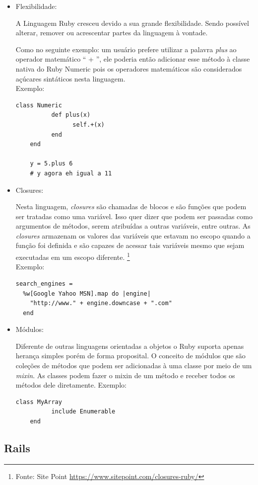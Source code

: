 \begin{itemize}
\item{Flexibilidade:}
    \par A Linguagem Ruby cresceu devido a sua grande flexibilidade. Sendo possível alterar, remover ou acrescentar partes da linguagem à vontade.
    \par Como no seguinte exemplo: um usuário prefere utilizar a palavra \emph{plus} ao operador matemático `` + '', ele poderia então adicionar esse método à classe nativa do Ruby Numeric pois os operadores matemáticos são considerados açúcares sintáticos nesta linguagem.
\\Exemplo:
\begin{lstlisting}[frame=single]
class Numeric
          def plus(x)
                self.+(x)
          end
    end

    y = 5.plus 6
    # y agora eh igual a 11
\end{lstlisting}
\item{Closures:}
    \par Nesta linguagem, \emph{closures} são chamadas de blocos e são funções que podem ser tratadas como uma variável. Isso quer dizer que podem ser passadas como argumentos de métodos, serem atribuídas a outras variáveis, entre outras. As \emph{closures} armazenam os valores das variáveis que estavam no escopo quando a função foi definida e são capazes de acessar tais variáveis mesmo que sejam executadas em um escopo diferente. \footnote{Fonte: Site Point \url{https://www.sitepoint.com/closures-ruby/}}
\\
Exemplo:
\begin{lstlisting}[frame=single]
search_engines =
  %w[Google Yahoo MSN].map do |engine|
    "http://www." + engine.downcase + ".com"
  end
\end{lstlisting}
\item{Módulos:}
    \par Diferente de outras linguagens orientadas a objetos o Ruby suporta apenas herança simples porém de forma proposital. O conceito de módulos que são coleções de métodos que podem ser adicionadas à uma classe por meio de um \emph{mixin}. As classes podem fazer o mixin de um método e receber todos os métodos dele diretamente.
Exemplo:
\begin{lstlisting}[frame=single]
class MyArray
          include Enumerable
    end
\end{lstlisting}

\end{itemize}
\subsection{Rails}

